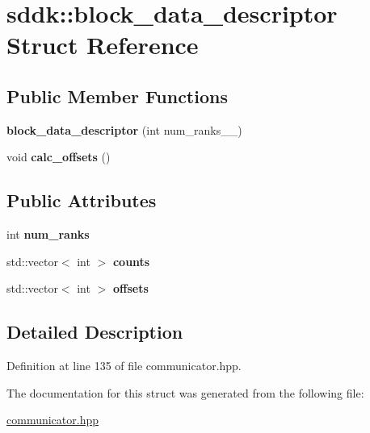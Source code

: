 \hypertarget{structsddk_1_1block__data__descriptor}{}\section{sddk\+:\+:block\+\_\+data\+\_\+descriptor Struct Reference}
\label{structsddk_1_1block__data__descriptor}
\subsection*{Public Member Functions}
\begin{DoxyCompactItemize}
\item 
\hypertarget{structsddk_1_1block__data__descriptor_aa76165d7bcbb66bcfa02a6f1c481665f}{}{\bfseries block\+\_\+data\+\_\+descriptor} (int num\+\_\+ranks\+\_\+\+\_\+)\label{structsddk_1_1block__data__descriptor_aa76165d7bcbb66bcfa02a6f1c481665f}

\item 
\hypertarget{structsddk_1_1block__data__descriptor_ab75a2317c87a83226651a835e2551f27}{}void {\bfseries calc\+\_\+offsets} ()\label{structsddk_1_1block__data__descriptor_ab75a2317c87a83226651a835e2551f27}

\end{DoxyCompactItemize}
\subsection*{Public Attributes}
\begin{DoxyCompactItemize}
\item 
\hypertarget{structsddk_1_1block__data__descriptor_ab89ca40a0c01bf3e91627403b72e1b25}{}int {\bfseries num\+\_\+ranks}\label{structsddk_1_1block__data__descriptor_ab89ca40a0c01bf3e91627403b72e1b25}

\item 
\hypertarget{structsddk_1_1block__data__descriptor_ac5fe9ef9c0859be959c0de19500b18f4}{}std\+::vector$<$ int $>$ {\bfseries counts}\label{structsddk_1_1block__data__descriptor_ac5fe9ef9c0859be959c0de19500b18f4}

\item 
\hypertarget{structsddk_1_1block__data__descriptor_a13f02b1f5dca1e69b68a22d97e5e26d2}{}std\+::vector$<$ int $>$ {\bfseries offsets}\label{structsddk_1_1block__data__descriptor_a13f02b1f5dca1e69b68a22d97e5e26d2}

\end{DoxyCompactItemize}


\subsection{Detailed Description}


Definition at line 135 of file communicator.\+hpp.



The documentation for this struct was generated from the following file\+:\begin{DoxyCompactItemize}
\item 
\hyperlink{communicator_8hpp}{communicator.\+hpp}\end{DoxyCompactItemize}
